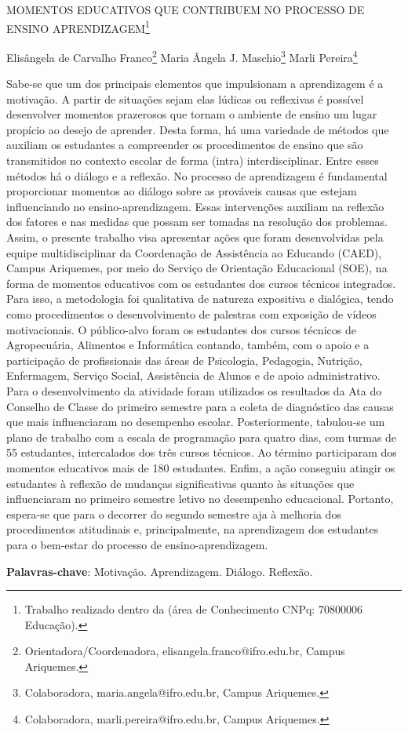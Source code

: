 \documentclass[article,12pt,onesidea,4paper,english,brazil]{abntex2}
\begin{document}
	
	
	\frenchspacing 
	
	\begin{center}
		\LARGE MOMENTOS EDUCATIVOS QUE CONTRIBUEM NO PROCESSO DE ENSINO APRENDIZAGEM\footnote{Trabalho realizado dentro da (área de Conhecimento CNPq: 70800006 Educação).}
		
		\normalsize
	Elisângela de Carvalho Franco\footnote{Orientadora/Coordenadora, elisangela.franco@ifro.edu.br, Campus Ariquemes.} 
	Maria Ângela J. Maschio\footnote{Colaboradora, maria.angela@ifro.edu.br, Campus Ariquemes.} 
	Marli Pereira\footnote{Colaboradora, marli.pereira@ifro.edu.br, Campus Ariquemes.} 
	\end{center}
	
	\noindent Sabe-se que um dos principais elementos que impulsionam a aprendizagem é a
	motivação. A partir de situações sejam elas lúdicas ou reflexivas é possível
	desenvolver momentos prazerosos que tornam o ambiente de ensino um lugar
	propício ao desejo de aprender. Desta forma, há uma variedade de métodos que
	auxiliam os estudantes a compreender os procedimentos de ensino que são
	transmitidos no contexto escolar de forma (intra) interdisciplinar. Entre esses
	métodos há o diálogo e a reflexão. No processo de aprendizagem é fundamental
	proporcionar momentos ao diálogo sobre as prováveis causas que estejam
	influenciando no ensino-aprendizagem. Essas intervenções auxiliam na reflexão dos
	fatores e nas medidas que possam ser tomadas na resolução dos problemas. Assim,
	o presente trabalho visa apresentar ações que foram desenvolvidas pela equipe
	multidisciplinar da Coordenação de Assistência ao Educando (CAED), Campus
	Ariquemes, por meio do Serviço de Orientação Educacional (SOE), na forma de
	momentos educativos com os estudantes dos cursos técnicos integrados. Para isso,
	a metodologia foi qualitativa de natureza expositiva e dialógica, tendo como
	procedimentos o desenvolvimento de palestras com exposição de vídeos
	motivacionais. O público-alvo foram os estudantes dos cursos técnicos de
	Agropecuária, Alimentos e Informática contando, também, com o apoio e a
	participação de profissionais das áreas de Psicologia, Pedagogia, Nutrição,
	Enfermagem, Serviço Social, Assistência de Alunos e de apoio administrativo. Para
	o desenvolvimento da atividade foram utilizados os resultados da Ata do Conselho
	de Classe do primeiro semestre para a coleta de diagnóstico das causas que mais
	influenciaram no desempenho escolar. Posteriormente, tabulou-se um plano de
	trabalho com a escala de programação para quatro dias, com turmas de 55
	estudantes, intercalados dos três cursos técnicos. Ao término participaram dos
	momentos educativos mais de 180 estudantes. Enfim, a ação conseguiu atingir os
	estudantes à reflexão de mudanças significativas quanto às situações que
	influenciaram no primeiro semestre letivo no desempenho educacional. Portanto,
	espera-se que para o decorrer do segundo semestre aja à melhoria dos
	procedimentos atitudinais e, principalmente, na aprendizagem dos estudantes para o
	bem-estar do processo de ensino-aprendizagem.
	
	\vspace{\onelineskip}
	
	\noindent
	\textbf{Palavras-chave}: Motivação. Aprendizagem. Diálogo. Reflexão.
	
\end{document}
